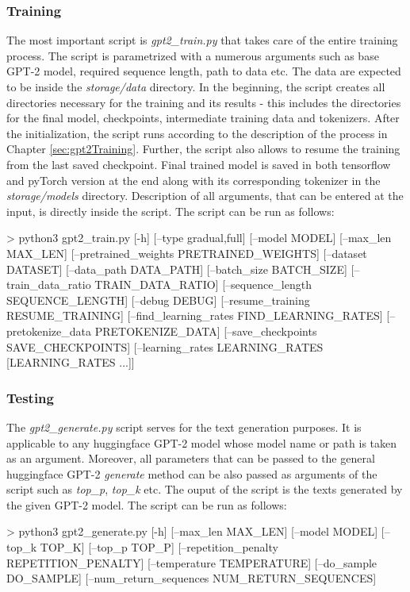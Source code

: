 \subsubsection*{Training}
The most important script is \textit{gpt2\_train.py} that takes care of the entire training process. The script is parametrized with a numerous arguments such as base GPT-2 model, required sequence length, path to data etc. The data are expected to be inside the \textit{storage/data} directory. In the beginning, the script creates all directories necessary for the training and its results - this includes the directories for the final model, checkpoints, intermediate training data and tokenizers. After the initialization, the script runs according to the description of the process in Chapter \ref{sec:gpt2Training}. Further, the script also allows to resume the training from the last saved checkpoint. Final trained model is saved in both tensorflow and pyTorch version at the end along with its corresponding tokenizer in the \textit{storage/models} directory. Description of all arguments, that can be entered at the input, is directly inside the script. The script can be run as follows:
\begin{code}
> python3 gpt2_train.py [-h] [--type {gradual,full}] 
                [--model MODEL] [--max_len MAX_LEN] 
                [--pretrained_weights PRETRAINED_WEIGHTS] 
                [--dataset DATASET] [--data_path DATA_PATH] 
                [--batch_size BATCH_SIZE]
                [--train_data_ratio TRAIN_DATA_RATIO] 
                [--sequence_length SEQUENCE_LENGTH] [--debug DEBUG] 
                [--resume_training RESUME_TRAINING] 
                [--find_learning_rates FIND_LEARNING_RATES]
                [--pretokenize_data PRETOKENIZE_DATA] 
                [--save_checkpoints SAVE_CHECKPOINTS] 
                [--learning_rates LEARNING_RATES [LEARNING_RATES ...]]
\end{code}
\newpage

\subsubsection*{Testing}
The \textit{gpt2\_generate.py} script serves for the text generation purposes. It is applicable to any huggingface GPT-2 model whose model name or path is taken as an argument. Moreover, all parameters that can be passed to the general huggingface GPT-2 \textit{generate} method can be also passed as arguments of the script such as \textit{top\_p}, \textit{top\_k} etc. The ouput of the script is the texts generated by the given GPT-2 model. The script can be run as follows:
\begin{code}
> python3 gpt2_generate.py [-h] [--max_len MAX_LEN] 
                          [--model MODEL] 
                          [--top_k TOP_K] 
                          [--top_p TOP_P] 
                          [--repetition_penalty REPETITION_PENALTY] 
                          [--temperature TEMPERATURE] 
                          [--do_sample DO_SAMPLE]
                          [--num_return_sequences NUM_RETURN_SEQUENCES]
\end{code}

